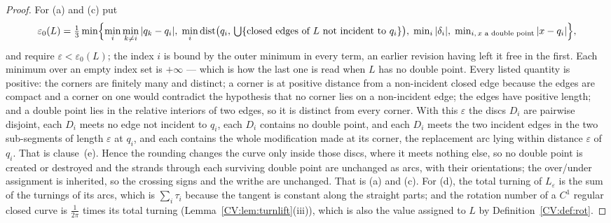 \begin{proof}
For (a) and (c) put
\[
   \varepsilon_0(L)=\tfrac13\min\Bigl\{
 \min_{i}\min_{k\neq i}|q_k-q_i|,\;
 \min_{i}\operatorname{dist}\bigl(q_i,\,\textstyle\bigcup\{\text{closed edges of }L\text{ not incident to }q_i\}\bigr),\;
 \min_i|\delta_i|,\;
 \min_{i,\,x\text{ a double point}}|x-q_i|
\Bigr\},
\]
and require $\varepsilon<\varepsilon_0(L)$; the index $i$ is bound by the outer
minimum in every term, an earlier revision having left it free in the first.
Each minimum over an empty index set is $+\infty$ --- which is how the last
one is read when $L$ has no double point. Every listed quantity is positive: the
corners are finitely many and distinct; a corner is at positive distance from a
non-incident closed edge because the edges are compact and a corner on one would
contradict the hypothesis that no corner lies on a non-incident edge; the edges have positive length; and a double point lies
in the relative interiors of two edges, so it is distinct from every corner.
With this $\varepsilon$ the discs $D_i$ are pairwise disjoint, each $D_i$ meets
no edge not incident to $q_i$, each $D_i$ contains no double point, and each
$D_i$ meets the two incident edges in the two sub-segments of length
$\varepsilon$ at $q_i$, and each contains the whole modification made at its
corner, the replacement arc lying within distance $\varepsilon$ of $q_i$. That
is clause~(e). Hence the rounding changes the curve only inside those
discs, where it meets nothing else, so no double point is created or destroyed
and the strands through each surviving double point are unchanged as arcs, with
their orientations; the over/under assignment is inherited, so the crossing signs
and the writhe are unchanged. That is (a) and (c). For (d), the total turning of
$L_\varepsilon$ is the sum of the turnings of its arcs, which is
$\sum_i\tau_i$ because the tangent is constant along the straight parts; and the
rotation number of a $C^1$ regular closed curve is $\frac1{2\pi}$ times its
total turning (Lemma~\ref{CV:lem:turnlift}(iii)), which is also the value assigned to $L$
by Definition~\ref{CV:def:rot}.
\end{proof}

